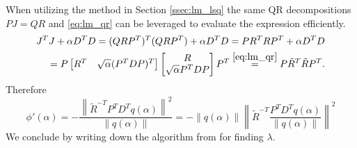 When utilizing the method in Section \ref{ssec:lm_lsq} the same QR decompositions $PJ = QR$ and \eqref{eq:lm_qr} can be leveraged to evaluate the expression efficiently.
\begin{equation}
  \begin{aligned}
    J^{T} J + \alpha D^{T} D = (QRP^{T})^{T} (QRP^{T}) + \alpha D^{T} D = P R^{T} R P^{T} + \alpha D^{T} D \\
    = P \begin{bmatrix} R^{T} & \sqrt{\alpha} (P^{T} D P)^{T} \end{bmatrix}\begin{bmatrix} R \\ \sqrt{\alpha} P^{T} D P \end{bmatrix} P^{T} \overset{\eqref{eq:lm_qr}}{=} P \tilde R^{T} \tilde R P^{T}.
  \end{aligned}
\end{equation}
Therefore
\begin{equation}
  \phi'(\alpha) = - \frac{\left\| \tilde R^{-T} P^{T} D^{T} q(\alpha) \right\|^{2}}{\| q(\alpha) \|} = - \| q(\alpha) \| \left\| \tilde R^{-T} \frac{P^{T} D^{T} q(\alpha) }{\| q(\alpha) \|} \right\|^{2}
\end{equation}
We conclude by writing down the algorithm from \cite{watson_levenberg-marquardt_1978} for finding $\lambda$.

